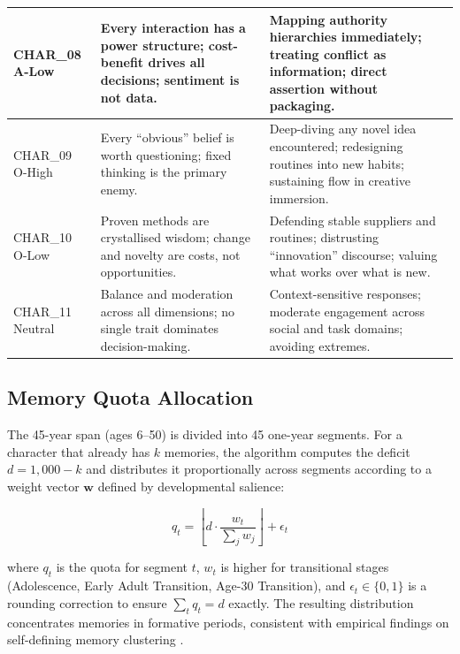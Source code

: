 \begin{table}[h]
{\begin{tabular}{p{1.5cm}p{4.2cm}p{8.5cm}}
\midrule
CHAR\_08 \newline A-Low &
Every interaction has a power structure; cost-benefit drives all decisions; sentiment is not data. &
Mapping authority hierarchies immediately; treating conflict as information; direct assertion without packaging. \\
\midrule
CHAR\_09 \newline O-High &
Every ``obvious'' belief is worth questioning; fixed thinking is the primary enemy. &
Deep-diving any novel idea encountered; redesigning routines into new habits; sustaining flow in creative immersion. \\
\midrule
CHAR\_10 \newline O-Low &
Proven methods are crystallised wisdom; change and novelty are costs, not opportunities. &
Defending stable suppliers and routines; distrusting ``innovation'' discourse; valuing what works over what is new. \\
\midrule
CHAR\_11 \newline Neutral &
Balance and moderation across all dimensions; no single trait dominates decision-making. &
Context-sensitive responses; moderate engagement across social and task domains; avoiding extremes. \\
\bottomrule
\end{tabular}%
}
\end{table}

\subsection{Memory Quota Allocation}
\label{app:stage_b}

The 45-year span (ages 6--50) is divided into 45 one-year segments. For a character that already has $k$ memories, the algorithm computes the deficit $d = 1{,}000 - k$ and distributes it proportionally across segments according to a weight vector $\mathbf{w}$ defined by developmental salience:

\begin{equation}
  q_t = \left\lfloor d \cdot \frac{w_t}{\sum_j w_j} \right\rfloor + \epsilon_t
\end{equation}

where $q_t$ is the quota for segment $t$, $w_t$ is higher for transitional stages (Adolescence, Early Adult Transition, Age-30 Transition), and $\epsilon_t \in \{0,1\}$ is a rounding correction to ensure $\sum_t q_t = d$ exactly. The resulting distribution concentrates memories in formative periods, consistent with empirical findings on self-defining memory clustering \cite{singer1995seeing}.

